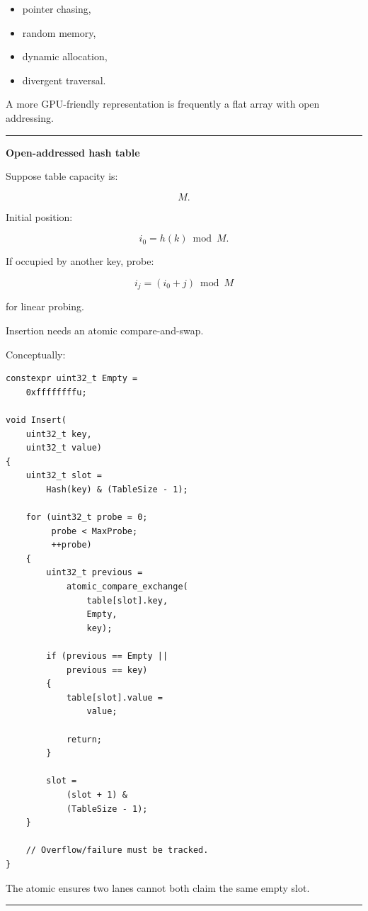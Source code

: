 \begin{itemize}
\tightlist
\item
  pointer chasing,
\item
  random memory,
\item
  dynamic allocation,
\item
  divergent traversal.
\end{itemize}

A more GPU-friendly representation is frequently a flat array with open addressing.

\begin{center}\rule{0.5\linewidth}{0.5pt}\end{center}

\textbf{Open-addressed hash table}

Suppose table capacity is:

\[
M.
\]

Initial position:

\[
i_0=h(k)\bmod M.
\]

If occupied by another key, probe:

\[
i_j=
(i_0+j)\bmod M
\]

for linear probing.

Insertion needs an atomic compare-and-swap.

Conceptually:

\protect{}\label{p10-hash-insert}%
\begin{verbatim}
constexpr uint32_t Empty =
    0xffffffffu;

void Insert(
    uint32_t key,
    uint32_t value)
{
    uint32_t slot =
        Hash(key) & (TableSize - 1);

    for (uint32_t probe = 0;
         probe < MaxProbe;
         ++probe)
    {
        uint32_t previous =
            atomic_compare_exchange(
                table[slot].key,
                Empty,
                key);

        if (previous == Empty ||
            previous == key)
        {
            table[slot].value =
                value;

            return;
        }

        slot =
            (slot + 1) &
            (TableSize - 1);
    }

    // Overflow/failure must be tracked.
}
\end{verbatim}

The atomic ensures two lanes cannot both claim the same empty slot.

\begin{center}\rule{0.5\linewidth}{0.5pt}\end{center}

